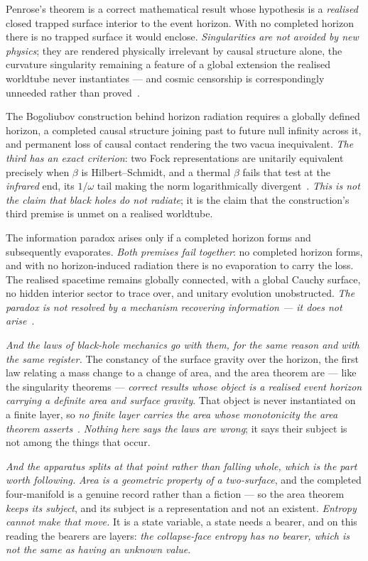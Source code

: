 \documentclass[11pt,a4paper]{article}
\theoremstyle{plain}
\theoremstyle{definition}
\begin{document}
Penrose's theorem is a correct mathematical result whose hypothesis is a \emph{realised} closed trapped
surface interior to the event horizon. With no completed horizon there is no trapped surface it would
enclose. \emph{Singularities are not avoided by new physics}; they are rendered physically irrelevant by
causal structure alone, the curvature singularity remaining a feature of a global extension the realised
worldtube never instantiates --- and cosmic censorship is correspondingly unneeded rather than
proved~\cite{JanzenBHcausality}.

The Bogoliubov construction behind horizon radiation requires a globally defined horizon, a completed causal
structure joining past to future null infinity across it, and permanent loss of causal contact rendering the
two vacua inequivalent. \emph{The third has an exact criterion}: two Fock representations are unitarily
equivalent precisely when $\beta$ is Hilbert--Schmidt, and a thermal $\beta$ fails that test at the
\emph{infrared} end, its $1/\omega$ tail making the norm logarithmically divergent~\cite{JanzenBHcausality}.
\emph{This is not the claim that black holes do not radiate}; it is the claim that the construction's third
premise is unmet on a realised worldtube.

The information paradox arises only if a completed horizon forms and subsequently evaporates. \emph{Both
premises fail together}: no completed horizon forms, and with no horizon-induced radiation there is no
evaporation to carry the loss. The realised spacetime remains globally connected, with a global Cauchy
surface, no hidden interior sector to trace over, and unitary evolution unobstructed. \emph{The paradox is
not resolved by a mechanism recovering information --- it does not arise}~\cite{JanzenBHcausality}.

\emph{And the laws of black-hole mechanics go with them, for the same reason and with the same
register.} The constancy of the surface gravity over the horizon, the first law relating a mass change to a
change of area, and the area theorem are --- like the singularity theorems --- \emph{correct results whose
object is a realised event horizon carrying a definite area and surface gravity}. That object is never
instantiated on a finite layer, so \emph{no finite layer carries the area whose monotonicity the area theorem
asserts}~\cite{JanzenCRframework}. \emph{Nothing here says the laws are wrong}; it says their subject is not
among the things that occur.

\emph{And the apparatus splits at that point rather than falling whole, which is the part worth following.}
\emph{Area is a geometric property of a two-surface}, and the completed four-manifold is a genuine record
rather than a fiction --- so the area theorem \emph{keeps its subject}, and its subject is a representation
and not an existent. \emph{Entropy cannot make that move.} It is a state variable, a state needs a bearer,
and on this reading the bearers are layers: \emph{the collapse-face entropy has no bearer, which is not the
same as having an unknown value}.
\end{document}
